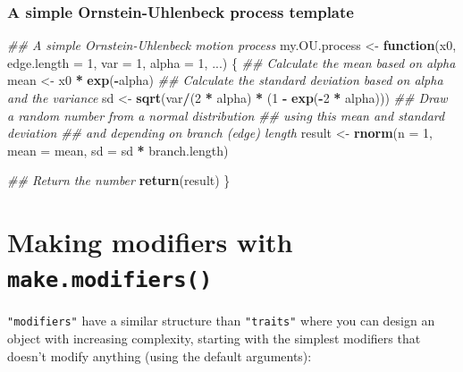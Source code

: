 \documentclass[]{book}
\newenvironment{Shaded}{\begin{snugshade}}{\end{snugshade}}
\newcommand{\CommentTok}[1]{\textcolor[rgb]{0.56,0.35,0.01}{\textit{#1}}}
\newcommand{\ControlFlowTok}[1]{\textcolor[rgb]{0.13,0.29,0.53}{\textbf{#1}}}
\newcommand{\DataTypeTok}[1]{\textcolor[rgb]{0.13,0.29,0.53}{#1}}
\newcommand{\DecValTok}[1]{\textcolor[rgb]{0.00,0.00,0.81}{#1}}
\newcommand{\KeywordTok}[1]{\textcolor[rgb]{0.13,0.29,0.53}{\textbf{#1}}}
\newcommand{\NormalTok}[1]{#1}
\newcommand{\OperatorTok}[1]{\textcolor[rgb]{0.81,0.36,0.00}{\textbf{#1}}}
\newcommand{\StringTok}[1]{\textcolor[rgb]{0.31,0.60,0.02}{#1}}
\begin{document}
\hypertarget{a-simple-ornstein-uhlenbeck-process-template}{%
\subsection{A simple Ornstein-Uhlenbeck process template}\label{a-simple-ornstein-uhlenbeck-process-template}}

\begin{Shaded}
\begin{Highlighting}[]
\CommentTok{## A simple Ornstein-Uhlenbeck motion process}
\NormalTok{my.OU.process <-}\StringTok{ }\ControlFlowTok{function}\NormalTok{(x0, }\DataTypeTok{edge.length =} \DecValTok{1}\NormalTok{, }\DataTypeTok{var =} \DecValTok{1}\NormalTok{, }\DataTypeTok{alpha =} \DecValTok{1}\NormalTok{, ...) \{}
    \CommentTok{## Calculate the mean based on alpha}
\NormalTok{    mean <-}\StringTok{ }\NormalTok{x0 }\OperatorTok{*}\StringTok{ }\KeywordTok{exp}\NormalTok{(}\OperatorTok{-}\NormalTok{alpha)}
    \CommentTok{## Calculate the standard deviation based on alpha and the variance}
\NormalTok{    sd <-}\StringTok{ }\KeywordTok{sqrt}\NormalTok{(var}\OperatorTok{/}\NormalTok{(}\DecValTok{2} \OperatorTok{*}\StringTok{ }\NormalTok{alpha) }\OperatorTok{*}\StringTok{ }\NormalTok{(}\DecValTok{1} \OperatorTok{-}\StringTok{ }\KeywordTok{exp}\NormalTok{(}\OperatorTok{-}\DecValTok{2} \OperatorTok{*}\StringTok{ }\NormalTok{alpha)))}
    \CommentTok{## Draw a random number from a normal distribution}
    \CommentTok{## using this mean and standard deviation}
    \CommentTok{## and depending on branch (edge) length}
\NormalTok{    result <-}\StringTok{ }\KeywordTok{rnorm}\NormalTok{(}\DataTypeTok{n =} \DecValTok{1}\NormalTok{, }\DataTypeTok{mean =}\NormalTok{ mean, }\DataTypeTok{sd =}\NormalTok{ sd }\OperatorTok{*}\StringTok{ }\NormalTok{branch.length)}

    \CommentTok{## Return the number}
    \KeywordTok{return}\NormalTok{(result)}
\NormalTok{\}}
\end{Highlighting}
\end{Shaded}

\hypertarget{makemodifiers}{%
\chapter{\texorpdfstring{Making modifiers with \texttt{make.modifiers()}}{Making modifiers with make.modifiers()}}\label{makemodifiers}}

\texttt{"modifiers"} have a similar structure than \texttt{"traits"} where you can design an object with increasing complexity, starting with the simplest modifiers that doesn't modify anything (using the default arguments):
\end{document}
